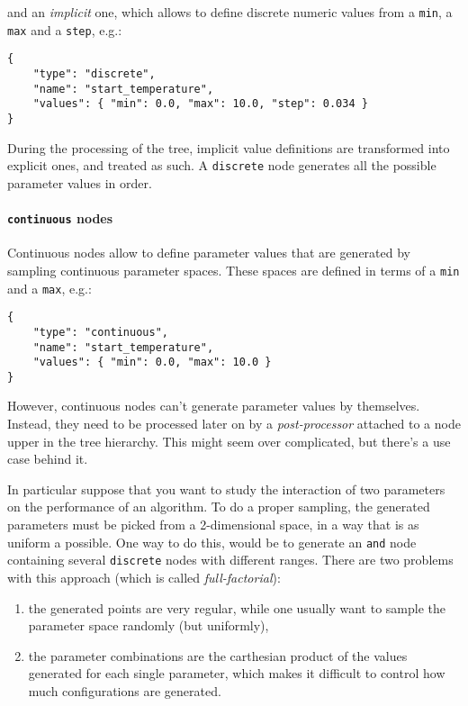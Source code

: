 \documentclass[11pt,notitlepage,twoside,a4paper]{article}
\begin{document}
\begin{footnotesize}
\noindent
and an \emph{implicit} one, which allows to define discrete numeric
values from a \texttt{min}, a \texttt{max} and a \texttt{step}, e.g.:

\begin{small}
\begin{lstlisting}
{
    "type": "discrete",
    "name": "start_temperature",
    "values": { "min": 0.0, "max": 10.0, "step": 0.034 }
}
\end{lstlisting}
\end{small}

During the processing of the tree, implicit value definitions are
transformed into explicit ones, and treated as such. A \texttt{discrete}
node generates all the possible parameter values in order.

\paragraph{\texttt{continuous} nodes}

Continuous nodes allow to define parameter values that are generated by
sampling continuous parameter spaces. These spaces are defined in terms
of a \texttt{min} and a \texttt{max}, e.g.:

\begin{lstlisting}
{
    "type": "continuous",
    "name": "start_temperature",
    "values": { "min": 0.0, "max": 10.0 }
}
\end{lstlisting}

However, continuous nodes can't generate parameter values by themselves.
Instead, they need to be processed later on by a \emph{post-processor}
attached to a node upper in the tree hierarchy. This might seem over
complicated, but there's a use case behind it.

In particular suppose that you want to study the interaction of two
parameters on the performance of an algorithm. To do a proper sampling,
the generated parameters must be picked from a 2-dimensional space, in a
way that is as uniform a possible. One way to do this, would be to
generate an \texttt{and} node containing several \texttt{discrete} nodes
with different ranges. There are two problems with this approach (which
is called \emph{full-factorial}):

\begin{enumerate}
\item
  the generated points are very regular, while one usually want to
  sample the parameter space randomly (but uniformly),
\item
  the parameter combinations are the carthesian product of the values
  generated for each single parameter, which makes it difficult to
  control how much configurations are generated.
\end{enumerate}


\end{footnotesize}
\end{document}
